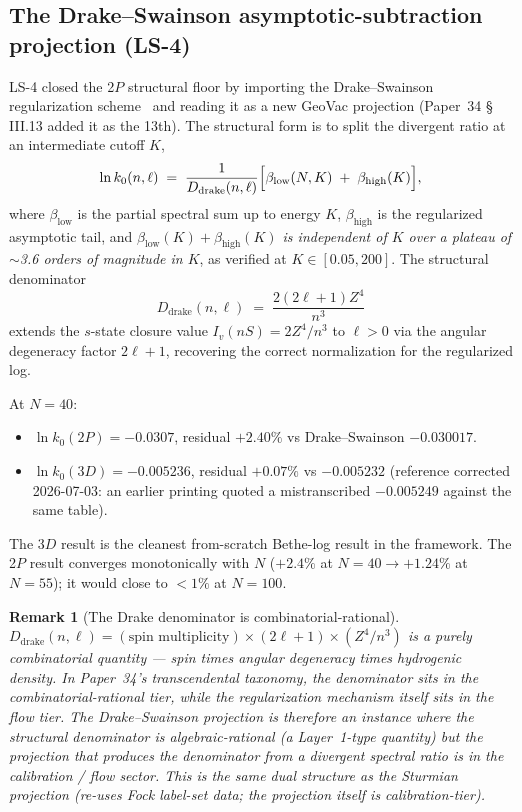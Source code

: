 \documentclass[11pt]{article}
\newtheorem{remark}{Remark}
\begin{document}
\subsection{The Drake--Swainson asymptotic-subtraction projection (LS-4)}

LS-4 closed the 2$P$ structural floor by importing the
Drake--Swainson regularization scheme~\cite{drake_swainson} and
reading it as a new GeoVac projection (Paper~34 \S\,III.13 added it
as the 13th).  The structural form is to split the divergent ratio
at an intermediate cutoff $K$,
\begin{equation}
\label{eq:drake_split}
\ln k_0(n, \ell) \;=\; \frac{1}{D_{\text{drake}}(n, \ell)}
\Bigl[ \beta_{\text{low}}(N, K) \;+\; \beta_{\text{high}}(K) \Bigr],
\end{equation}
where $\beta_{\text{low}}$ is the partial spectral sum up to energy
$K$, $\beta_{\text{high}}$ is the regularized asymptotic tail, and
\emph{$\beta_{\text{low}}(K) + \beta_{\text{high}}(K)$ is independent
of $K$ over a plateau of $\sim$3.6 orders of magnitude in $K$}, as
verified at $K \in [0.05, 200]$.  The structural denominator
\begin{equation}
\label{eq:drake_denom}
D_{\text{drake}}(n, \ell) \;=\; \frac{2(2\ell + 1) Z^4}{n^3}
\end{equation}
extends the $s$-state closure value $I_v(nS) = 2Z^4/n^3$ to
$\ell > 0$ via the angular degeneracy factor $2\ell + 1$, recovering
the correct normalization for the regularized log.

At $N = 40$:
\begin{itemize}
\setlength\itemsep{0pt}
\item $\ln k_0(2P) = -0.0307$, residual $+2.40\%$ vs Drake--Swainson
$-0.030017$.
\item $\ln k_0(3D) = -0.005236$, residual $+0.07\%$ vs $-0.005232$
(reference corrected 2026-07-03: an earlier printing quoted a
mistranscribed $-0.005249$ against the same table).
\end{itemize}
The 3$D$ result is the cleanest from-scratch Bethe-log result in the
framework.  The 2$P$ result converges monotonically with $N$ ($+2.4\%$
at $N=40 \to +1.24\%$ at $N=55$); it would close to $<1\%$ at $N=100$.

\begin{remark}[The Drake denominator is combinatorial-rational]
\label{rem:drake_denom_combinatorial}
$D_{\text{drake}}(n, \ell) = (\text{spin multiplicity}) \times
(2\ell + 1) \times (Z^4/n^3)$ is a purely combinatorial
quantity --- spin times angular degeneracy times hydrogenic density.
In Paper~34's transcendental taxonomy, the denominator sits in
the combinatorial-rational tier, while the regularization mechanism
itself sits in the flow tier.  The Drake--Swainson projection is
therefore an instance where the structural denominator is
algebraic-rational (a Layer~1-type quantity) but the projection that
\emph{produces} the denominator from a divergent spectral ratio is in
the calibration / flow sector.  This is the same dual structure as
the Sturmian projection (re-uses Fock label-set data; the projection
itself is calibration-tier).
\end{remark}
\end{document}
